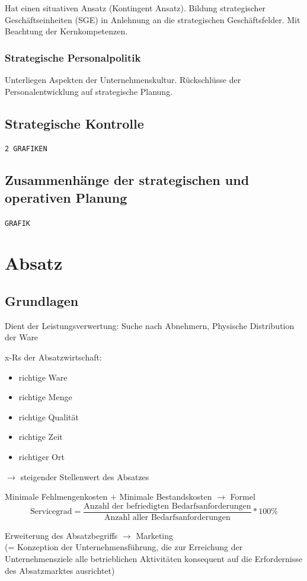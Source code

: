 \documentclass[a4paper,11pt, twoside]{article}
\begin{document}
Hat einen situativen Ansatz (Kontingent Ansatz). Bildung strategischer Geschäftseinheiten (SGE) in Anlehnung an die strategischen Geschäftsfelder. Mit Beachtung der Kernkompetenzen.

\subsubsection*{Strategische Personalpolitik}
Unterliegen Aspekten der Unternehmenskultur. Rückschlüsse der Personalentwicklung auf strategische Planung.

\subsection{Strategische Kontrolle}

\texttt{2 GRAFIKEN}

\subsection{Zusammenhänge der strategischen und operativen Planung}

\texttt{GRAFIK}

\newpage
\section{Absatz}

\subsection{Grundlagen}
Dient der Leistungsverwertung: Suche nach Abnehmern, Physische Distribution der Ware

x-Rs der Absatzwirtschaft:
\begin{itemize}
	\item richtige Ware
	\item richtige Menge
	\item richtige Qualität
	\item richtige Zeit
	\item richtiger Ort
\end{itemize}
$\rightarrow$ steigender Stellenwert des Absatzes

Minimale Fehlmengenkosten + Minimale Bestandskosten $\rightarrow$ Formel
\[
\text{Servicegrad} = \frac{\text{Anzahl der befriedigten Bedarfsanforderungen}}{\text{Anzahl aller Bedarfsanforderungen}} * 100\%
\]


Erweiterung des Absatzbegriffs $\rightarrow$ Marketing\\ 
(= Konzeption der Unternehmensführung, die zur Erreichung der Unternehmensziele alle betrieblichen Aktivitäten konsequent auf die Erfordernisse des Absatzmarktes ausrichtet)
\end{document}
